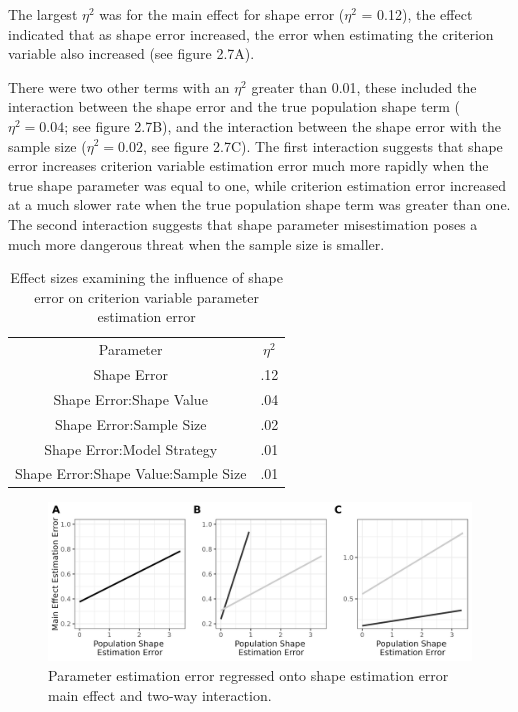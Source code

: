\documentclass[12pt]{./styles/outhesis}
\begin{document}
The largest \(\eta^2\) was for the main effect for shape error
(\(\eta^2\) = 0.12), the effect indicated that as shape error increased,
the error when estimating the criterion variable also increased (see
figure 2.7A).

There were two other terms with an \(\eta^2\) greater than 0.01, these
included the interaction between the shape error and the true population
shape term (\(\eta^2 = 0.04\); see figure 2.7B), and the interaction
between the shape error with the sample size (\(\eta^2=0.02\), see
figure 2.7C). The first interaction suggests that shape error increases
criterion variable estimation error much more rapidly when the true
shape parameter was equal to one, while criterion estimation error
increased at a much slower rate when the true population shape term was
greater than one. The second interaction suggests that shape parameter
misestimation poses a much more dangerous threat when the sample size is
smaller.


\begin{table}
    \centering
    \begin{tabular}{cc}
        Parameter & \(\eta^2\) \\
        Shape Error & .12 \\
        Shape Error:Shape Value & .04 \\
        Shape Error:Sample Size & .02\\
        Shape Error:Model Strategy & .01\\
        Shape Error:Shape Value:Sample Size & .01\\
    \end{tabular}
    \caption{Effect sizes examining the influence of shape error on
criterion variable parameter estimation error}
    \label{tab:my_label}
\end{table}

\begin{figure}
\includegraphics[width=12cm]{figures/shapeEstimationError.png}
\caption{Parameter estimation error regressed onto shape estimation
error main effect and two-way interaction.}
\end{figure}
\end{document}
